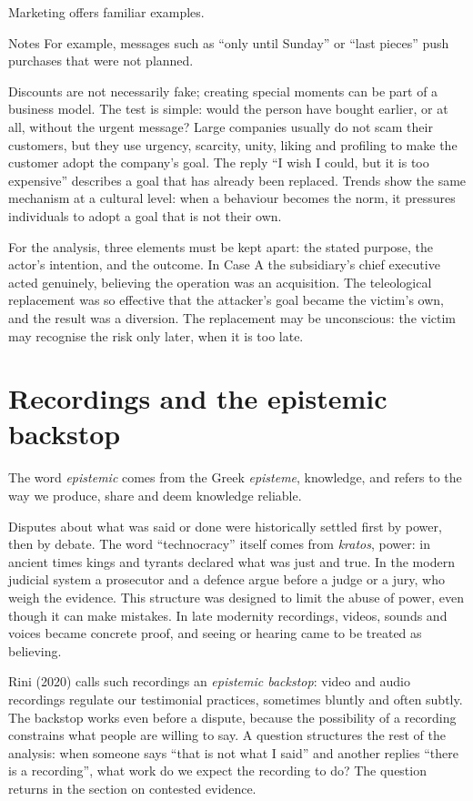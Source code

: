 Marketing offers familiar examples.

\begin{nota}{Notes}
	For example, messages such as ``only until Sunday'' or ``last pieces'' push purchases that were not planned.
\end{nota}

Discounts are not necessarily fake; creating special moments can be part of a business model. The test is simple: would the person have bought earlier, or at all, without the urgent message? Large companies usually do not scam their customers, but they use urgency, scarcity, unity, liking and profiling to make the customer adopt the company's goal. The reply ``I wish I could, but it is too expensive'' describes a goal that has already been replaced. Trends show the same mechanism at a cultural level: when a behaviour becomes the norm, it pressures individuals to adopt a goal that is not their own.

For the analysis, three elements must be kept apart: the stated purpose, the actor's intention, and the outcome. In Case A the subsidiary's chief executive acted genuinely, believing the operation was an acquisition. The teleological replacement was so effective that the attacker's goal became the victim's own, and the result was a diversion. The replacement may be unconscious: the victim may recognise the risk only later, when it is too late.

\section{Recordings and the epistemic backstop}
The word \emph{epistemic} comes from the Greek \emph{episteme}, knowledge, and refers to the way we produce, share and deem knowledge reliable.

Disputes about what was said or done were historically settled first by power, then by debate. The word ``technocracy'' itself comes from \emph{kratos}, power: in ancient times kings and tyrants declared what was just and true. In the modern judicial system a prosecutor and a defence argue before a judge or a jury, who weigh the evidence. This structure was designed to limit the abuse of power, even though it can make mistakes. In late modernity recordings, videos, sounds and voices became concrete proof, and seeing or hearing came to be treated as believing.

Rini (2020) calls such recordings an \emph{epistemic backstop}: video and audio recordings regulate our testimonial practices, sometimes bluntly and often subtly. The backstop works even before a dispute, because the possibility of a recording constrains what people are willing to say. A question structures the rest of the analysis: when someone says ``that is not what I said'' and another replies ``there is a recording'', what work do we expect the recording to do? The question returns in the section on contested evidence.

